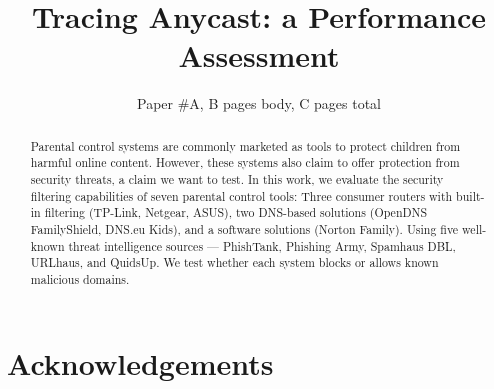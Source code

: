 \documentclass[10pt,sigconf,letterpaper]{acmart}
\begin{document}
 \pagestyle{plain}
  
 \title{Tracing Anycast: a Performance Assessment}

 \newif\ifisanon

\iftrue
\newcommand{\raf}[1]{\textcolor{violet}{\noindent[Raf: #1]}}
\else
\newcommand{\raf}[1]{}
\fi
 
\newcommand{\ie}{\textit{i.e.}}
\newcommand{\etc}{\textit{etc.}}
\newcommand{\eg}{\textit{e.g.}}
 
\isanontrue

\ifisanon

\author{Paper \#A, B pages body, C pages total}
\else 
\author{blaat
}

\fi

\def \manycasttwo  {MAnycast\textsuperscript{2}\xspace}
\def \manycast  {MAnycastR\xspace}

\begin{abstract}
Parental control systems are commonly marketed as tools to protect children from harmful online content. 
However, these systems also claim to offer protection from security threats, a claim we want to test. 
In this work, we evaluate the security filtering capabilities of seven parental control tools: Three consumer routers with built-in filtering (TP-Link, Netgear, ASUS), two DNS-based solutions (OpenDNS FamilyShield, DNS.eu Kids), and a software solutions (Norton Family). 
Using five well-known threat intelligence sources — PhishTank, Phishing Army, Spamhaus DBL, URLhaus, and QuidsUp.
We test whether each system blocks or allows known malicious domains. 
\end{abstract}

\maketitle











\section{Acknowledgements}





%
\end{document}
